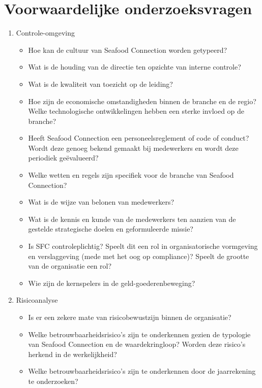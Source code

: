 \section{Voorwaardelijke onderzoeksvragen}
\begin{enumerate}
    \item Controle-omgeving
        \begin{itemize}
            \item Hoe kan de cultuur van Seafood Connection worden getypeerd?
            \item Wat is de houding van de directie ten opzichte van interne controle?
            \item Wat is de kwaliteit van toezicht op de leiding?
            \item Hoe zijn de economische omstandigheden binnen de branche en de regio? Welke technologische ontwikkelingen hebben een sterke invloed op de branche?
            \item Heeft Seafood Connection een personeelsreglement of code of conduct? Wordt deze genoeg bekend gemaakt bij medewerkers en wordt deze periodiek geëvalueerd?
            \item Welke wetten en regels zijn specifiek voor de branche van Seafood Connection?
            \item Wat is de wijze van belonen van medewerkers?
            \item Wat is de kennis en kunde van de medewerkers ten aanzien van de gestelde strategische doelen en geformuleerde missie?
            \item Is SFC controleplichtig? Speelt dit een rol in organisatorische vormgeving en verslaggeving (mede met het oog op compliance)? Speelt de grootte van de organisatie een rol?
            \item Wie zijn de kernspelers in de geld-goederenbeweging?
        \end{itemize}
    \item Risicoanalyse
        \begin{itemize}
            \item Is er een zekere mate van risicobewustzijn binnen de organisatie?
            \item Welke betrouwbaarheidsrisico's zijn te onderkennen gezien de typologie van Seafood Connection en de waardekringloop? Worden deze risico's herkend in de werkelijkheid?
            \item Welke betrouwbaarheidsrisico's zijn te onderkennen door de jaarrekening te onderzoeken?

\end{itemize}
\end{enumerate}
